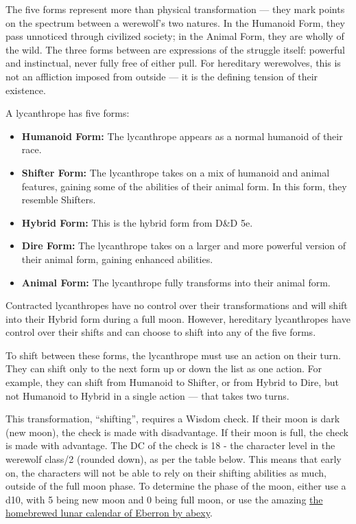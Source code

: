 \documentclass[twocolumn]{dndbook}
\begin{document}
The five forms represent more than physical transformation --- they mark points on the spectrum between a werewolf's two natures.
In the Humanoid Form, they pass unnoticed through civilized society; in the Animal Form, they are wholly of the wild.
The three forms between are expressions of the struggle itself: powerful and instinctual, never fully free of either pull.
For hereditary werewolves, this is not an affliction imposed from outside --- it is the defining tension of their existence.

A lycanthrope has five forms:
\begin{itemize}
    \item \textbf{Humanoid Form:} The lycanthrope appears as a normal humanoid of their race.
    \item \textbf{Shifter Form:} The lycanthrope takes on a mix of humanoid and animal features, gaining some of the abilities of their animal form. In this form, they resemble Shifters.
    \item \textbf{Hybrid Form:} This is the hybrid form from D\&D 5e.
    \item \textbf{Dire Form:} The lycanthrope takes on a larger and more powerful version of their animal form, gaining enhanced abilities.
    \item \textbf{Animal Form:} The lycanthrope fully transforms into their animal form.
\end{itemize}

Contracted lycanthropes have no control over their transformations and will shift into their Hybrid form during a full moon.
However, hereditary lycanthropes have control over their shifts and can choose to shift into any of the five forms.\par

To shift between these forms, the lycanthrope must use an action on their turn.
They can shift only to the next form up or down the list as one action.
For example, they can shift from Humanoid to Shifter, or from Hybrid to Dire, but not Humanoid to Hybrid in a single action --- that takes two turns.\par

This transformation, ``shifting'', requires a Wisdom check. If their moon is dark (new moon), the check is made with disadvantage.
If their moon is full, the check is made with advantage.
The DC of the check is 18 - the character level in the werewolf class/2 (rounded down), as per the table below.
This means that early on, the characters will not be able to rely on their shifting abilities as much, outside of the full moon phase.
To determine the phase of the moon, either use a d10, with 5 being new moon and 0 being full moon,
or use the amazing \href{https://drive.google.com/file/d/1XxNb80pKTArS2SecLkFQE3nnbXTwt2j9/view}{the homebrewed lunar calendar of Eberron by abexy}.
\end{document}
